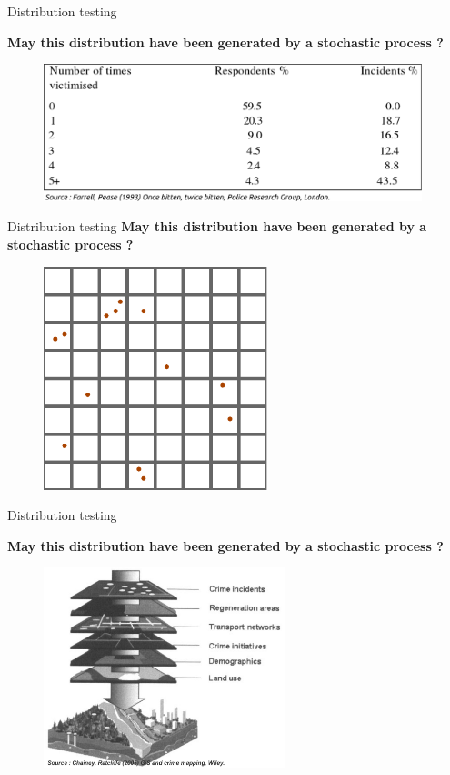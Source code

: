 \begin{frame}{Distribution testing}

\textbf{May this distribution have been generated by a stochastic process ?}

\begin{figure}
  \includegraphics[width=11cm]{CrimeConcentration.pdf}
\end{figure}

\end{frame}


\begin{frame}{Distribution testing}
\textbf{May this distribution have been generated by a stochastic process ?}

\begin{figure}
  \includegraphics[width=6.5cm]{ExPoisson.pdf}
\end{figure}

\end{frame}


\begin{frame}{Distribution testing}

\textbf{May this distribution have been generated by a stochastic process ?}

\begin{figure}
  \includegraphics[width=7cm]{Chainey.jpg}
\end{figure}

\end{frame}


